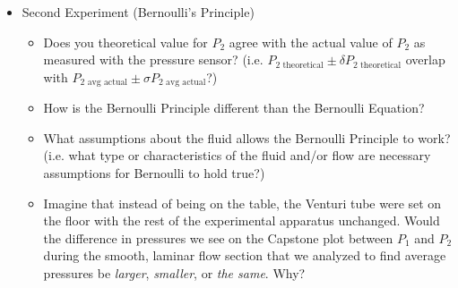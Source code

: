 \begin{itemize}
    \item Second Experiment (Bernoulli's Principle)
\begin{itemize}
    \item Does you theoretical value for $P_2$ agree with the actual value of $P_2$ as measured with the pressure sensor? \newline (i.e. $P_{2\text{ theoretical}} \pm \delta P_{2\text{ theoretical}}$ overlap with $P_{2\text{ avg actual}} \pm \sigma P_{2\text{ avg actual}}$?)
    \item How is the Bernoulli Principle different than the Bernoulli Equation?
    \item What assumptions about the fluid allows the Bernoulli Principle to work? (i.e. what type or characteristics of the fluid and/or flow are necessary assumptions for Bernoulli to hold true?)
    \item Imagine that instead of being on the table, the Venturi tube were set on the floor with the rest of the experimental apparatus unchanged. Would the difference in pressures we see on the Capstone plot between $P_1$ and $P_2$ during the smooth, laminar flow section that we analyzed to find average pressures be \textit{larger}, \textit{smaller}, or \textit{the same}. Why?
\end{itemize}


    

\end{itemize}
